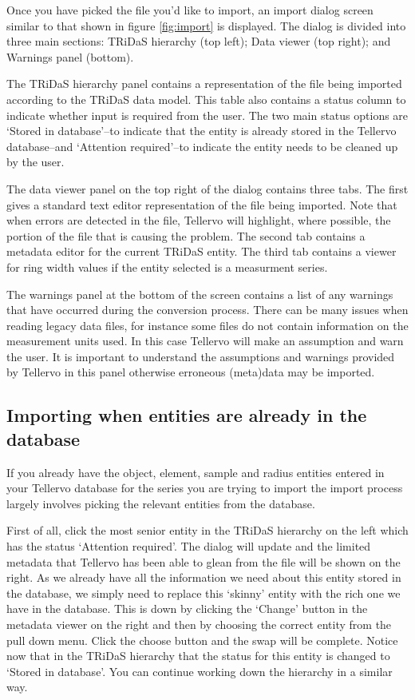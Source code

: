 Once you have picked the file you'd like to import, an import dialog screen similar to that shown in figure \ref{fig:import} is displayed. The dialog is divided into three main sections: TRiDaS hierarchy (top left); Data viewer (top right); and Warnings panel (bottom).   

The TRiDaS hierarchy panel contains a representation of the file being imported according to the TRiDaS data model.  This table also contains a status column to indicate whether input is required from the user.  The two main status options are `Stored in database'--to indicate that the entity is already stored in the Tellervo database--and `Attention required'--to indicate the entity needs to be cleaned up by the user.  

The data viewer panel on the top right of the dialog contains three tabs.  The first gives a standard text editor representation of the file being imported.  Note that when errors are detected in the file, Tellervo will highlight, where possible, the portion of the file that is causing the problem.  The second tab contains a metadata editor for the current TRiDaS entity.  The third tab contains a viewer for ring width values if the entity selected is a measurment series.

The warnings panel at the bottom of the screen contains a list of any warnings that have occurred during the conversion process.  There can be many issues when reading legacy data files, for instance some files do not contain information on the measurement units used.  In this case Tellervo will make an assumption and warn the user.  It is important to understand the assumptions and warnings provided by Tellervo in this panel otherwise erroneous (meta)data may be imported.

\subsection{Importing when entities are already in the database}
If you already have the object, element, sample and radius entities entered in your Tellervo database for the series you are trying to import the import process largely involves picking the relevant entities from the database.  

First of all, click the most senior entity in the TRiDaS hierarchy on the left which has the status `Attention required'.  The dialog will update and the limited metadata that Tellervo has been able to glean from the file will be shown on the right.  As we already have all the information we need about this entity stored in the database, we simply need to replace this `skinny' entity with the rich one we have in the database.  This is down by clicking the `Change' button in the metadata viewer on the right and then by choosing the correct entity from the pull down menu.  Click the choose button and the swap will be complete.  Notice now that in the TRiDaS hierarchy that the status for this entity is changed to `Stored in database'.  You can continue working down the hierarchy in a similar way.

